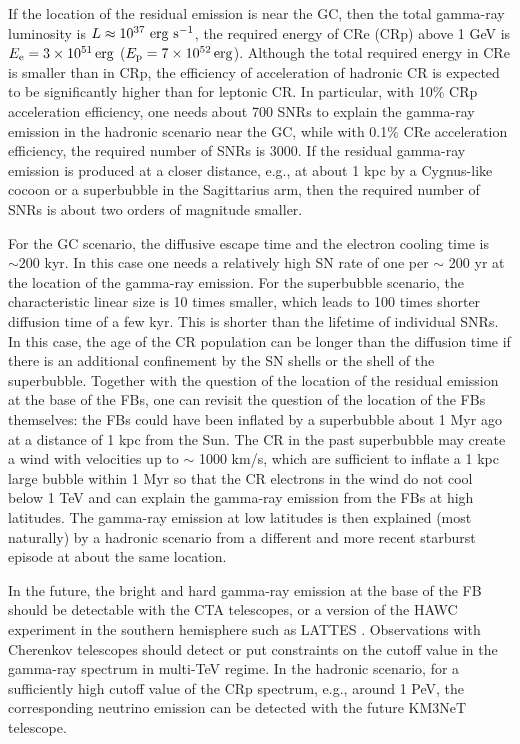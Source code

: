 If the location of the residual emission is near the GC,
then the total gamma-ray luminosity is $L \approx 10^{37}\ {\rm erg\ s^{-1}}$,
the required energy of CRe (CRp) above 1 GeV is $E_{\rm e} = \SI{3e51}{erg}$
($E_{\rm p} = \SI{7e52}{erg}$).
Although the total required energy in CRe is smaller than in CRp,
the efficiency of acceleration of hadronic CR is expected to be significantly higher than for leptonic CR.
In particular, with 10\% CRp acceleration efficiency, one needs about 700 SNRs to explain the 
gamma-ray emission in the hadronic scenario near the GC,
while with 0.1\% CRe acceleration efficiency, the required number of SNRs is 3000.
If the residual gamma-ray emission is produced at a closer distance, e.g., at about 1 kpc
by a Cygnus-like cocoon or a superbubble in the Sagittarius arm, 
then the required number of SNRs is about two orders of magnitude smaller.

For the GC scenario, the diffusive escape time and the electron cooling time is $\sim 200$ kyr.
In this case one needs a relatively high SN rate of one per $\sim$ 200 yr at the location of the gamma-ray emission.
For the superbubble scenario, the characteristic linear size is 10 times smaller, which leads to 100 times shorter
diffusion time of a few kyr. This is shorter than the lifetime of individual SNRs.
In this case, the age of the CR population can be longer than the diffusion time if there is an
additional confinement by the SN shells or the shell of the superbubble.
Together with the question of the location of the residual emission at the base of the FBs,
one can revisit the question of the location of the FBs themselves:
the FBs could have been inflated by a superbubble about 1 Myr ago
at a distance of 1 kpc from the Sun.
The CR in the past superbubble may create a wind with velocities up to $\sim$ 1000 km/s, 
which are sufficient to inflate a 1 kpc large bubble within 1 Myr
so that the CR electrons in the wind do not cool below 1 TeV and can explain the
gamma-ray emission from the FBs at high latitudes.
The gamma-ray emission at low latitudes is then explained (most naturally) by a hadronic
scenario from a different and more recent starburst episode at about the same location.

In the future, the bright and hard gamma-ray emission at the base of the FB
should be detectable with the CTA telescopes, or a version of the HAWC experiment in the southern hemisphere such as 
LATTES \citep{2017arXiv170909624A}.
Observations with Cherenkov telescopes should detect or put constraints on the cutoff value in the gamma-ray spectrum in multi-TeV regime.
In the hadronic scenario, for a sufficiently high cutoff value of the CRp spectrum, e.g., around 1 PeV,
the corresponding neutrino emission can be detected with the future KM3NeT telescope.


